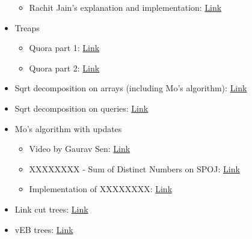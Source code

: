 \documentclass[11pt]{article}
\begin{document}
\begin{itemize}
\begin{itemize}
\item Rachit Jain's explanation and implementation: \href{http://rachitiitr.blogspot.com/2017/06/wavelet-trees-wavelet-trees-editorial.html}{Link}
\end{itemize}
\item Treaps
\begin{itemize}
\item Quora part 1: \href{https://www.quora.com/q/threadsiiithyderabad/Treaps-One-Tree-to-Rule-em-all-Part-1}{Link}
\item Quora part 2: \href{https://www.quora.com/q/threadsiiithyderabad/Treaps-One-Tree-to-Rule-em-all-Part-2}{Link}
\end{itemize}
\item Sqrt decomposition on arrays (including Mo's algorithm): \href{https://cp-algorithms.com/data\_structures/sqrt\_decomposition.html}{Link}
\item Sqrt decomposition on queries: \href{https://codeforces.com/blog/entry/15406?\#comment-203308}{Link}
\item Mo's algorithm with updates
\begin{itemize}
\item Video by Gaurav Sen: \href{https://www.youtube.com/watch?v=gUpfwVRXhNY}{Link}
\item XXXXXXXX - Sum of Distinct Numbers on SPOJ: \href{https://www.spoj.com/problems/XXXXXXXX/}{Link}
\item Implementation of XXXXXXXX: \href{https://github.com/szawinis/CompetitiveProgramming/blob/master/SPOJ/XXXXXXXX.cpp}{Link}
\end{itemize}
\item Link cut trees: \href{https://www.youtube.com/watch?v=XZLN6NxEQWo}{Link}
\item vEB trees: \href{https://www.youtube.com/watch?v=hmReJCupbNU}{Link}
\end{itemize}
\end{document}
